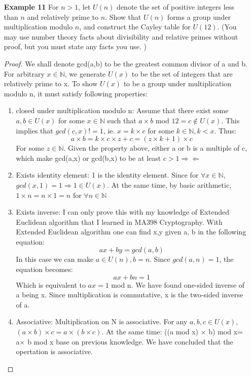 \documentclass[11pt, oneside]{article}
\newcommand{\N}{\mathbb N}
\begin{document}
\begin{enumerate}
\item[{\bf Example 11}] For $n>1$, let $U(n)$ denote the set of positive integers less than $n$ and relatively prime to $n$. Show that $U(n)$ forms a group under multiplication modulo $n$, and construct the Cayley table for $U(12)$. (You may use number theory facts about divisibility and relative primes without proof, but you must state any facts you use. )
\begin{proof}
We shall denote gcd(a,b) to be the greatest common divisor of a and b. For arbitrary $x\in \N$, we generate $U(x)$ to be the set of integers that are relatively prime to x. To show $U(x)$ to be a group under multiplication modulo n, it must satisfy following properties:
\begin{enumerate}
    \item closed under multiplication modulo n: Assume that there exist some $a, b \in U(x)$ for some $x \in \N$ such that $a \times b$ mod $12 = c \notin U(x)$. This implies that $gcd(c,x)!=1$, ie. $x=k\times c$ for some $k\in \N, k<x$. Thus:
    \[a \times b =k\times c \times z + c = (z\times k +1)\times c \]
    For some $z\in \N$. Given the property above, either a or b is a multiple of c, which make gcd(a,x) or gcd(b,x) to be at least $c>1\Rightarrow\Leftarrow$
    \item Exists identity element: 1 is the identity element. Since for $\forall x\in \N$, $gcd(x, 1)= 1 \Rightarrow{} 1\in U(x)$. At the same time, by basic arithmetic, $1\times n = n \times 1= n$ for $\forall n \in \N$
    \item Exists inverse: I can only prove this with my knowledge of Extended Euclidean algorithm that I learned in MA398 Cryptography. With Extended Euclidean algorithm one can find x,y given a, b in the following equation:
\[ax+by=gcd(a,b)\]
    In this case we can make $a\in U(n), b=n$. Since $gcd(a, n)=1$, the equation becomes:
\[ax+bn=1\]
    Which is equivalent to $ax=1$ mod n. We have found one-sided inverse of a being x. Since multiplication is commutative, x is the two-sided inverse of a. 
    \item Associative: Multiplication on N is associative. For any $a, b, c \in U(x)$, $(a\times b) \times c = a\times (b \times c)$. At the same time: ((a mod x) $\times$ b) mod x= a$\times$ b mod x base on previous knowledge. We have concluded that the opertation is associative.
\end{enumerate}
\end{proof}




\end{enumerate}
\end{document}
